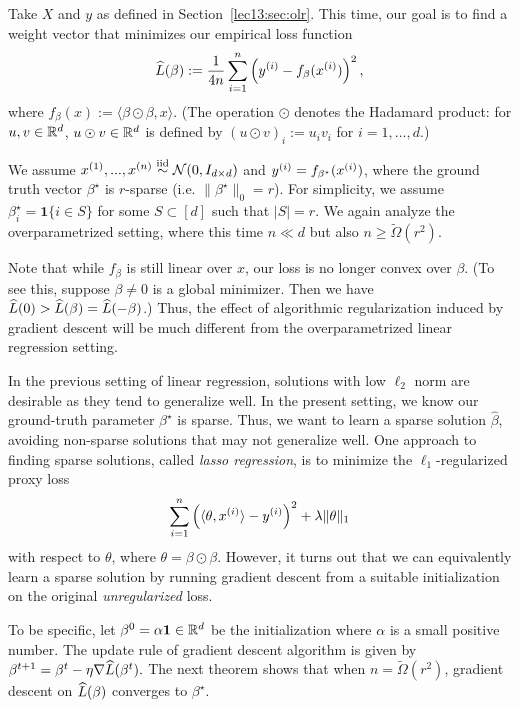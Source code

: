 Take $X$ and $y$ as defined in Section~\ref{lec13:sec:olr}. This time, our goal is to find a weight vector that minimizes our empirical loss function
\begin{equation}
\hatL(\beta) := \frac{1}{4n}\sum_{i=1}^n \left(y\sp{i} - f_\beta(x\sp{i})\right)^2,
\end{equation}
where $f_\beta(x):= \langle \beta \odot \beta, x\rangle$. (The operation $\odot$ denotes the Hadamard product: for $u,v \in \bbR^d$, $u \odot v \in \bbR^d$ is defined by $(u \odot v)_i := u_i v_i$ for $i = 1, \dots, d$.)

We assume $x\sp{1},...,x\sp{n} \iid \cN(0,I_{d \times d})$ and $y\sp{i} = f_{\beta^\star}(x\sp{i})$, where the ground truth vector $\beta^\star$ is $r$-sparse (i.e. $\|\beta^\star\|_0 = r$). For simplicity, we assume $\beta_i^\star = \mathbf{1} \{i \in S\}$ for some $S \subset [d]$ such that $|S| = r$. We again analyze the overparametrized setting, where this time $n \ll d$ but also $n \geq \widetilde \Omega(r^2)$.

Note that while $f_\beta$ is still linear over $x$, our loss is no longer convex over $\beta$. (To see this, suppose $\beta \neq 0$ is a global minimizer. Then we have $\hatL(0) > \hatL(\beta) = \hatL(-\beta)$.) Thus, the effect of algorithmic regularization induced by gradient descent will be much different from the overparametrized linear regression setting. 

In the previous setting of linear regression, solutions with low $\ell_2$ norm are desirable as they tend to generalize well. In the present setting, we know our ground-truth parameter $\beta^\star$ is sparse. Thus, we want to learn a sparse solution $\hat \beta$, avoiding non-sparse solutions that may not generalize well. One approach to finding sparse solutions, called \textit{lasso regression}, is to minimize the $\ell_1$-regularized proxy loss
\begin{equation}
\sum_{i=1}^n \left(\langle \theta, x\sp{i} \rangle - y\sp{i} \right)^2 + \lambda \| \theta \|_1
\end{equation}
with respect to $\theta$, where $\theta = \beta \odot \beta$. However, it turns out that we can equivalently learn a sparse solution by running gradient descent from a suitable initialization on the original \textit{unregularized} loss.

To be specific, let $\beta^0=\alpha \mathbf{1} \in \R^d$ be the initialization where $\alpha$ is a small positive number. The update rule of gradient descent algorithm is given by $\beta^{t+1}=\beta^t-\eta\nabla \hatL(\beta^{t}).$ The next theorem shows that when $n=\widetilde{\Omega}(r^2)$, gradient descent on $\hatL(\beta)$ converges to $\beta^\star.$

